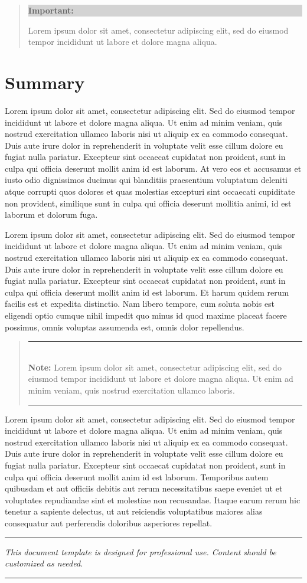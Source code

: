 \documentclass[11pt,a4paper]{article}
\newcommand{\loremtext}[1]{%
  Lorem ipsum dolor sit amet, consectetur adipiscing elit. Sed do eiusmod tempor incididunt ut labore et dolore magna aliqua. Ut enim ad minim veniam, quis nostrud exercitation ullamco laboris nisi ut aliquip ex ea commodo consequat. Duis aute irure dolor in reprehenderit in voluptate velit esse cillum dolore eu fugiat nulla pariatur. Excepteur sint occaecat cupidatat non proident, sunt in culpa qui officia deserunt mollit anim id est laborum.%
}
\newenvironment{keypoint}%
{\begin{quote}\textcolor{audiomageblue}{\rule{\textwidth}{1pt}}\vspace{0.2em}\\\textbf{Note:} }%
{\vspace{0.2em}\\\textcolor{audiomageblue}{\rule{\textwidth}{1pt}}\end{quote}}
\newenvironment{highlight}%
{\begin{quote}\colorbox{lightgray}{\parbox{\dimexpr\linewidth-2\fboxsep}{\textbf{Important:} }}}%
{\end{quote}}
\begin{document}
\begin{highlight}
Lorem ipsum dolor sit amet, consectetur adipiscing elit, sed do eiusmod tempor incididunt ut labore et dolore magna aliqua.
\end{highlight}

\section{Summary}

\loremtext{18} At vero eos et accusamus et iusto odio dignissimos ducimus qui blanditiis praesentium voluptatum deleniti atque corrupti quos dolores et quas molestias excepturi sint occaecati cupiditate non provident, similique sunt in culpa qui officia deserunt mollitia animi, id est laborum et dolorum fuga.

\loremtext{19} Et harum quidem rerum facilis est et expedita distinctio. Nam libero tempore, cum soluta nobis est eligendi optio cumque nihil impedit quo minus id quod maxime placeat facere possimus, omnis voluptas assumenda est, omnis dolor repellendus.

\begin{keypoint}
Lorem ipsum dolor sit amet, consectetur adipiscing elit, sed do eiusmod tempor incididunt ut labore et dolore magna aliqua. Ut enim ad minim veniam, quis nostrud exercitation ullamco laboris.
\end{keypoint}

\loremtext{20} Temporibus autem quibusdam et aut officiis debitis aut rerum necessitatibus saepe eveniet ut et voluptates repudiandae sint et molestiae non recusandae. Itaque earum rerum hic tenetur a sapiente delectus, ut aut reiciendis voluptatibus maiores alias consequatur aut perferendis doloribus asperiores repellat.

\vspace{2cm}
\begin{center}
\textcolor{secondary}{\rule{0.5\textwidth}{0.5pt}}

\textcolor{secondary}{\textit{This document template is designed for professional use. Content should be customized as needed.}}

\textcolor{secondary}{\rule{0.5\textwidth}{0.5pt}}
\end{center}
\end{document}
